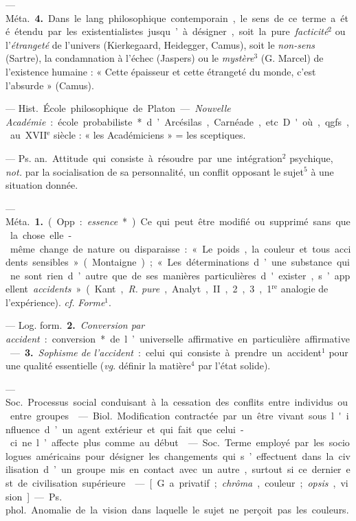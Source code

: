 \begin{itemize}[leftmargin=1cm, label=, itemsep=1pt]
— \si{Méta.} {\bf 4.} Dans le lang. philosophique contemporain, le sens de
ce terme a été étendu par les existentialistes jusqu’à désigner, soit la
pure {\it facticité}$^2$ ou l'{\it étrangeté} de l'univers (Kierkegaard, Heidegger, Camus),
soit le {\it non-sens} (Sartre), la
condamnation à l'échec (Jaspers) ou
le {\it mystère}$^3$ (G. Marcel) de l'existence
humaine : « Cette épaisseur et cette
étrangeté du monde, c’est l'absurde »
(Camus).

 — \si{Hist.} École philosophique de Platon.
— {\it Nouvelle Académie} :
école probabiliste* d’Arcésilas, Carnéade, etc. D'où, qgfs., au
{\footnotesize XVII}$^\text{e}$ siècle : « les Académiciens »
= les sceptiques.

 — \si{Ps. an.} Attitude qui
consiste à résoudre par une intégration$^2$ psychique, {\it not.} par la socialisation
de sa personnalité, un conflit
opposant le sujet$^5$ à une situation
donnée.

 — \si{Méta.} {\bf 1.} (Opp. : {\it essence}*).
Ce qui peut être modifié ou supprimé sans que la chose elle-même
change de nature ou disparaisse :
« Le poids, la couleur et tous accidents sensibles » (Montaigne); « Les
déterminations d’une substance qui
ne sont rien d’autre que de ses manières particulières d'exister,
s’appellent {\it accidents} » (Kant, {\it R. pure},
Analyt., II, 2, 3, 1$^\text{re}$ analogie de l’expérience). {\it cf.}  {\it Forme}$^1$.

— \si{Log. form.} {\bf 2.} {\it Conversion par
accident} : conversion* de l’universelle affirmative en particulière
affirmative. — {\bf 3.} {\it Sophisme de l’accident} : celui qui consiste à prendre
un accident$^1$ pour une qualité essentielle ({\it vg}. définir la matière$^4$ par
l’état solide).

 — \si{Soc.} Processus
social conduisant à la cessation des
conflits entre individus ou entre
groupes.

 — \si{Biol.} Modification
contractée par un être vivant sous
l'influence d’un agent extérieur et
qui fait que celui-ci ne l’affecte plus
comme au début.

 — \si{Soc.} Terme employé
par les sociologues américains pour
désigner les changements qui s’effectuent dans la civilisation d’un groupe
mis en contact avec un autre, surtout si ce dernier est de civilisation
supérieure.

 — [G. a privatif; {\it chrôma},
couleur; {\it opsis}, vision] — \si{Ps. phol.}
Anomalie de la vision dans laquelle
le sujet ne perçoit pas les couleurs.


\end{itemize}
